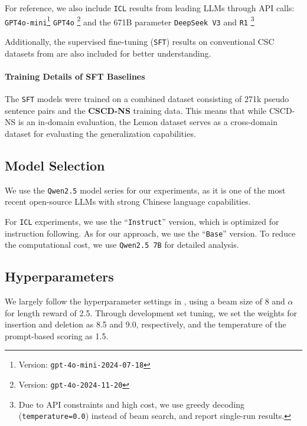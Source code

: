 For reference, we also include \texttt{ICL} results from leading LLMs through API calls: \texttt{GPT4o-mini}\rlap{,}\footnote{Version: \texttt{gpt-4o-mini-2024-07-18}} \texttt{GPT4o} \cite{hurst-etal-2024-gpt4o}\rlap{,}\footnote{Version: \texttt{gpt-4o-2024-11-20}} and the 671B parameter \texttt{DeepSeek\,V3} and \texttt{R1} \cite{deepseekai-2024-deepseek-v3,deepseek-r1-2025}\footnote{Due to API constraints and high cost, we use greedy decoding (\texttt{temperature=0.0}) instead of beam search, and report single-run results.}

Additionally, the supervised fine-tuning (\texttt{SFT}) results on conventional CSC datasets from \citet{li-etal-2024-cllm} are also included for better understanding.

\paragraph{Training Details of SFT Baselines}
The \texttt{SFT} models were trained on a combined dataset consisting of 271k pseudo sentence pairs \cite{wang-etal-2018-hybrid} and the \textbf{CSCD-NS} training data.
This means that while CSCD-NS is an in-domain evaluation, the Lemon dataset serves as a cross-domain dataset for evaluating the generalization capabilities.

\subsection{Model Selection}
We use the \texttt{Qwen2.5} model series \cite{yang-etal-2024-qwen25} for our experiments, as it is one of the most recent open-source LLMs with strong Chinese language capabilities.

For \texttt{ICL} experiments, we use the ``\texttt{Instruct}'' version, which is optimized for instruction following.
As for our approach, we use the ``\texttt{Base}'' version.
To reduce the computational cost, we use \texttt{Qwen2.5\,7B} for detailed analysis.

\subsection{Hyperparameters}
We largely follow the hyperparameter settings in \citet{zhou-etal-2024-simple}, using a beam size of 8 and $\alpha$ for length reward of 2.5.
Through development set tuning, we set the weights for insertion and deletion as 8.5 and 9.0, respectively, and the temperature of the prompt-based scoring as 1.5.
